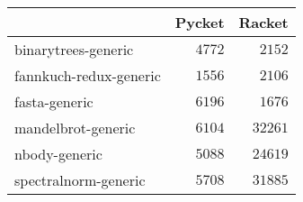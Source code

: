 {\footnotesize
\begin{tabular}{l@{}r@{}r}
\toprule
\multicolumn{1}{l}{}&\multicolumn{1}{c}{Pycket}&\multicolumn{1}{c}{Racket}\tabularnewline
\midrule
binarytrees-generic&$4772$&$ 2152$\tabularnewline
fannkuch-redux-generic&$1556$&$ 2106$\tabularnewline
fasta-generic&$6196$&$ 1676$\tabularnewline
mandelbrot-generic&$6104$&$32261$\tabularnewline
nbody-generic&$5088$&$24619$\tabularnewline
spectralnorm-generic&$5708$&$31885$\tabularnewline
\bottomrule
\end{tabular}}
